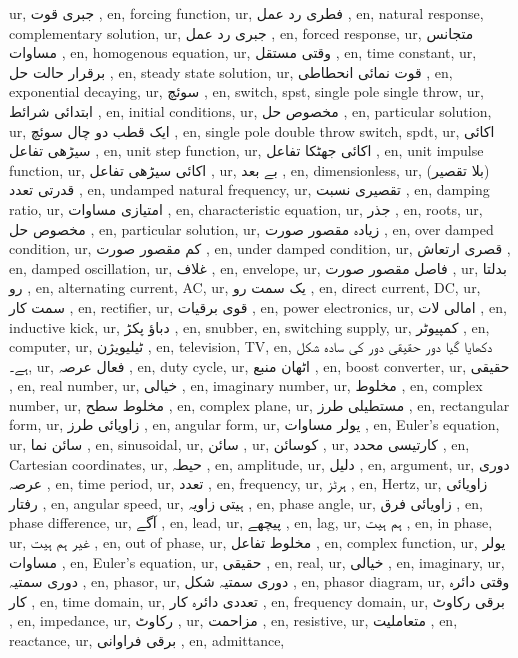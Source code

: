 ur, جبری قوت ,
en, forcing function,
ur, فطری رد عمل ,
en, natural response, complementary solution,
ur, جبری رد عمل ,
en, forced response,
ur, متجانس مساوات ,
en, homogenous equation,
ur, وقتی مستقل ,
en, time constant,
ur, برقرار حالت حل ,
en, steady state solution,
ur, قوت نمائی انحطاطی ,
en, exponential decaying,
ur, سوئچ ,
en, switch, spst, single pole single throw,
ur, ابتدائی شرائط ,
en, initial conditions,
ur, مخصوص حل ,
en, particular solution,
ur, ایک قطب دو چال سوئچ ,
en, single pole double throw switch, spdt,
ur, اکائی سیڑھی تفاعل ,
en, unit step function,
ur, اکائی جھٹکا تفاعل ,
en, unit impulse function,
ur, اکائی سیڑھی تفاعل ,
ur, بے بعد ,
en, dimensionless,
ur, (بلا تقصیر) قدرتی تعدد ,
en, undamped natural frequency,
ur, تقصیری نسبت ,
en, damping ratio,
ur, امتیازی مساوات ,
en, characteristic equation,
ur, جذر ,
en, roots,
ur, مخصوص حل ,
en, particular solution,
ur, زیادہ مقصور صورت ,
en, over damped condition,
ur, کم مقصور صورت ,
en, under damped condition,
ur, قصری ارتعاش ,
en, damped oscillation,
ur, غلاف ,
en, envelope,
ur, فاصل مقصور صورت ,
ur, بدلتا رو ,
en, alternating current, AC,
ur, یک سمت رو ,
en, direct current, DC,
ur, سمت کار ,
en, rectifier,
ur, قوی برقیات ,
en, power electronics,
ur, امالی لات ,
en, inductive kick,
ur, دباؤ پکڑ ,
en, snubber,
en, switching supply,
ur, کمپیوٹر ,
en, computer,
ur, ٹیلیویژن ,
en, television, TV,
en, دکھایا گیا دور حقیقی دور کی سادہ شکل ہے۔,
ur, فعال عرصہ ,
en, duty cycle,
ur, اٹھان منبع ,
en, boost converter,
ur, حقیقی ,
en, real number,
ur, خیالی ,
en, imaginary number,
ur, مخلوط ,
en, complex number,
ur, مخلوط سطح ,
en, complex plane,
ur, مستطیلی طرز ,
en, rectangular form,
ur, زاویائی طرز ,
en, angular form,
ur, یولر مساوات ,
en, Euler's equation,
ur, سائن نما ,
en, sinusoidal,
ur, سائن ,
ur, کوسائن ,
ur, کارتیسی محدد ,
en, Cartesian coordinates,
ur, حیطہ ,
en, amplitude,
ur, دلیل ,
en, argument,
ur, دوری عرصہ ,
en, time period,
ur, تعدد ,
en, frequency,
ur, ہرٹز ,
en, Hertz,
ur, زاویائی رفتار ,
en, angular speed,
ur, ہیتی زاویہ ,
en, phase angle,
ur, زاویائی فرق ,
en, phase difference,
ur, آگے ,
en, lead,
ur, پیچھے ,
en, lag,
ur, ہم ہیت ,
en, in phase,
ur, غیر ہم ہیت ,
en, out of phase,
ur, مخلوط تفاعل ,
en, complex function,
ur, یولر مساوات ,
en, Euler's equation,
ur, حقیقی ,
en, real,
ur, خیالی ,
en, imaginary,
ur, دوری سمتیہ ,
en, phasor,
ur, دوری سمتیہ شکل ,
en, phasor diagram,
ur, وقتی دائرہ کار ,
en, time domain,
ur, تعددی دائرہ کار ,
en, frequency domain,
ur, برقی رکاوٹ ,
en, impedance,
ur, رکاوٹ ,
ur, مزاحمت ,
en, resistive,
ur, متعاملیت ,
en, reactance,
ur, برقی فراوانی ,
en, admittance,

